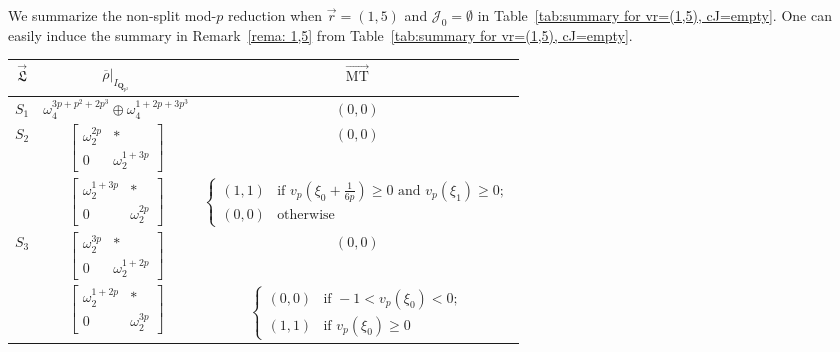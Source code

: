\documentclass[11pt]{amsart}
\theoremstyle{definition}
\numberwithin{equation}{subsection}
\theoremstyle{plain}
\theoremstyle{plain}
\theoremstyle{plain}
\theoremstyle{plain}
\theoremstyle{plain}
\theoremstyle{plain}
\theoremstyle{plain}
\theoremstyle{plain}
\theoremstyle{plain}
\theoremstyle{plain}
\theoremstyle{plain}
\theoremstyle{plain}
\theoremstyle{definition}
\theoremstyle{definition}
\theoremstyle{definition}
\theoremstyle{remark}
\renewcommand{\(}{\textup{(}}
\renewcommand{\)}{\textup{)}}
\newcommand{\Q}{\mathbf{Q}}
\newcommand{\rhobar}{\overline{\rho}}
\newcommand{\fL}{\mathfrak{L}}
\newcommand{\cJ}{\mathcal{J}}
\newcommand{\vr}{\vec{r}}
\newcommand{\vL}{\vec{\fL}}
\newcommand{\IQptwo}{{I_{\Q_{p^2}}}}
\begin{document}
We summarize the non-split mod-$p$ reduction when $\vr=(1,5)$ and $\cJ_0=\emptyset$ in Table~\ref{tab:summary for vr=(1,5), cJ=empty}. One can easily induce the summary in Remark~\ref{rema: 1,5} from Table~\ref{tab:summary for vr=(1,5), cJ=empty}.
\begin{table}[htbp]
    \centering
    \begin{tabular}{|c||c|c|}
    \hline
        $\vL$ & $\rhobar|_\IQptwo$ & $\vec{\mathrm{MT}}$ \\\hline\hline
        $S_1$
            & $\omega_4^{3p+p^2+2p^3}\oplus\omega_4^{1+2p+3p^3}$
            & $(0,0)$ \\\hline
        \multirow{2}{*}[-1.5ex]{$S_2$}
            & $
            \begin{bmatrix}
                \omega_2^{2p} & * \\ 0 & \omega_2^{1+3p}
            \end{bmatrix}$
            & $(0,0)$\\\cline{2-3}
            & $
            \begin{bmatrix}
                \omega_2^{1+3p} & * \\ 0 & \omega_2^{2p}
            \end{bmatrix}$
            & $
            \begin{cases}
                (1,1) &\mbox{if } v_p(\xi_0+\frac{1}{6p})\geq 0 \mbox{ and }v_p(\xi_1)\geq 0; \\
                (0,0) &\mbox{otherwise}
            \end{cases}$ \\\hline
        \multirow{2}{*}[-1.5ex]{$S_3$}
            & $
            \begin{bmatrix}
                \omega_2^{3p} & * \\ 0 & \omega_2^{1+2p}
            \end{bmatrix}$
            & $(0,0)$\\\cline{2-3}
            & $
            \begin{bmatrix}
                \omega_2^{1+2p} & * \\ 0 & \omega_2^{3p}
            \end{bmatrix}$
            & $
            \begin{cases}
                (0,0) &\mbox{if } -1<v_p(\xi_0)<0; \\
                (1,1) &\mbox{if } v_p(\xi_0)\geq 0
            \end{cases}$  \\\hline

\end{tabular}
\end{table}
\end{document}
